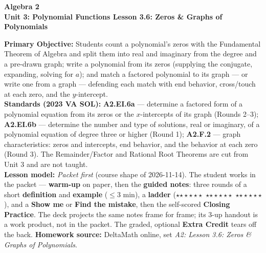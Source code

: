 \documentclass[10pt]{article}
\newcommand{\CourseName}{Algebra 2}
\newcommand{\UnitNumberName}{Unit 3: Polynomial Functions \quad}
\newcommand{\LessonNumberName}{Lesson 3.6: Zeros \& Graphs of Polynomials}
\newcommand{\rung}[1]{{\color{goldacc}\ifcase#1\or$\star$\or$\star\star$\or$\star\star\star$\fi}}
\begin{document}
\begin{center}
    {\Large\bfseries \CourseName \\
    {\small\bfseries \UnitNumberName \LessonNumberName}}
\end{center}

\begin{tcolorbox}[colback=forestbg, colframe=forest, boxrule=0.9pt, arc=2mm,
    left=2mm, right=2mm, top=1.5mm, bottom=1.5mm]
    \textbf{Primary Objective:} Students count a polynomial's zeros with the Fundamental Theorem
    of Algebra and split them into real and imaginary from the degree and a pre-drawn graph;
    write a polynomial from its zeros (supplying the conjugate, expanding, solving for $a$); and
    match a factored polynomial to its graph --- or write one from a graph --- defending each
    match with end behavior, cross/touch at each zero, and the $y$-intercept.
    \\[2pt]
    \textbf{Standards (2023 VA SOL):} \textbf{A2.EI.6a} --- determine a factored form of a
    polynomial equation from its zeros or the $x$-intercepts of its graph (Rounds 2--3);
    \textbf{A2.EI.6b} --- determine the number and type of solutions, real or imaginary, of a
    polynomial equation of degree three or higher (Round 1); \textbf{A2.F.2} --- graph
    characteristics: zeros and intercepts, end behavior, and the behavior at each zero (Round 3).
    The Remainder/Factor and Rational Root Theorems are cut from Unit 3 and are not taught.
    \\[2pt]
    \textbf{Lesson model:} \emph{Packet first} (course shape of 2026-11-14). The student works in the
    packet --- \textbf{warm-up} on paper, then the \textbf{guided notes}: three rounds of a short
    \textbf{definition} and \textbf{example} ($\le$3 min), a \textbf{ladder} (\rung1\ \rung2\
    \rung3), and a \textbf{Show me} or \textbf{Find the mistake}, then the self-scored
    \textbf{Closing Practice}. The deck projects the same notes frame for frame; its 3-up
    handout is a work product, not in the packet. The graded, optional \textbf{Extra Credit}
    tears off the back. \textbf{Homework source:} DeltaMath online, set \emph{A2: Lesson 3.6:
    Zeros \& Graphs of Polynomials}.
\end{tcolorbox}
\end{document}
